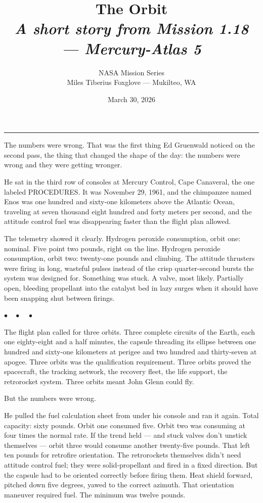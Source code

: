 \documentclass[12pt, letterpaper]{article}
\title{\Huge\textbf{The Orbit}\\[0.5em]\large\textit{A short story from Mission 1.18 --- Mercury-Atlas 5}}
\author{NASA Mission Series\\[0.3em]\small Miles Tiberius Foxglove --- Mukilteo, WA}
\date{March 30, 2026}
\begin{document}
\maketitle
\thispagestyle{empty}

\vspace{1em}
\noindent\rule{\textwidth}{0.4pt}
\vspace{1em}

\noindent The numbers were wrong. That was the first thing Ed Gruenwald noticed on the second pass, the thing that changed the shape of the day: the numbers were wrong and they were getting wronger.

He sat in the third row of consoles at Mercury Control, Cape Canaveral, the one labeled PROCEDURES. It was November 29, 1961, and the chimpanzee named Enos was one hundred and sixty-one kilometers above the Atlantic Ocean, traveling at seven thousand eight hundred and forty meters per second, and the attitude control fuel was disappearing faster than the flight plan allowed.

The telemetry showed it clearly. Hydrogen peroxide consumption, orbit one: nominal. Five point two pounds, right on the line. Hydrogen peroxide consumption, orbit two: twenty-one pounds and climbing. The attitude thrusters were firing in long, wasteful pulses instead of the crisp quarter-second bursts the system was designed for. Something was stuck. A valve, most likely. Partially open, bleeding propellant into the catalyst bed in lazy surges when it should have been snapping shut between firings.

\begin{center}
$\bullet\quad\bullet\quad\bullet$
\end{center}

The flight plan called for three orbits. Three complete circuits of the Earth, each one eighty-eight and a half minutes, the capsule threading its ellipse between one hundred and sixty-one kilometers at perigee and two hundred and thirty-seven at apogee. Three orbits was the qualification requirement. Three orbits proved the spacecraft, the tracking network, the recovery fleet, the life support, the retrorocket system. Three orbits meant John Glenn could fly.

But the numbers were wrong.

He pulled the fuel calculation sheet from under his console and ran it again. Total capacity: sixty pounds. Orbit one consumed five. Orbit two was consuming at four times the normal rate. If the trend held --- and stuck valves don't unstick themselves --- orbit three would consume another twenty-five pounds. That left ten pounds for retrofire orientation. The retrorockets themselves didn't need attitude control fuel; they were solid-propellant and fired in a fixed direction. But the capsule had to be oriented correctly before firing them. Heat shield forward, pitched down five degrees, yawed to the correct azimuth. That orientation maneuver required fuel. The minimum was twelve pounds.
\end{document}
